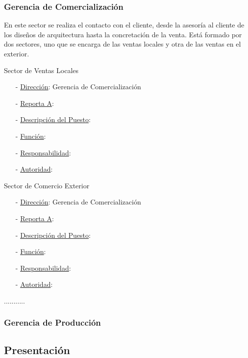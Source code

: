 \documentclass[a4paper,10pt,titlepage]{article}
\begin{document}
\subsubsection{Gerencia de Comercializaci\'on}

En este sector se realiza el contacto con el cliente, desde la asesor\'ia al cliente de los dise\~nos de arquitectura 
hasta la concretaci\'on de la venta. Est\'a formado por dos sectores, uno que se encarga de las ventas locales y otra
de las ventas en el exterior.\\

\begin{description}
 \item Sector de Ventas Locales
    \begin{itemize}
    \item[-] \underline{Direcci\'on}: Gerencia de Comercializaci\'on
    \item[-] \underline{Reporta A}:
    \item[-] \underline{Descripci\'on del Puesto}:
    \item[-] \underline{Funci\'on}:
    \item[-] \underline{Responsabilidad}:
    \item[-] \underline{Autoridad}:
    \end{itemize}


 \item Sector de Comercio Exterior
    \begin{itemize}
    \item[-] \underline{Direcci\'on}: Gerencia de Comercializaci\'on
    \item[-] \underline{Reporta A}:
    \item[-] \underline{Descripci\'on del Puesto}:
    \item[-] \underline{Funci\'on}:
    \item[-] \underline{Responsabilidad}:
    \item[-] \underline{Autoridad}:
    \end{itemize}
\end{description}

...........



\subsubsection{Gerencia de Producci\'on}

\newpage
\vspace*{\fill}
\begin{center}
\begingroup
\titlerule
\vspace{1cm}
\section{Presentaci\'on}
\vspace{1cm}
\titlerule
\endgroup
\end{center}
\vspace*{\fill}
\end{document}
